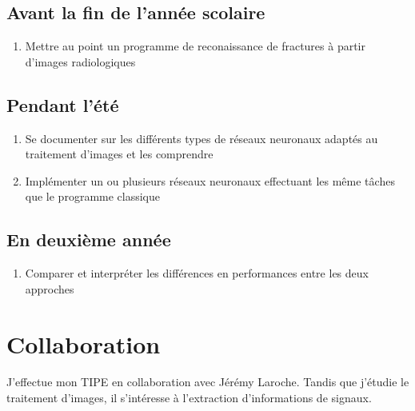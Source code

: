 \documentclass{article}
\begin{document}
\subsection{Avant la fin de l'année scolaire}

\begin{enumerate}
	\item Mettre au point un programme de reconaissance de fractures à partir d'images radiologiques
\end{enumerate}

\subsection{Pendant l'été}

\begin{enumerate}
	\item Se documenter sur les différents types de réseaux neuronaux adaptés au traitement d'images et les comprendre
	\item Implémenter un ou plusieurs réseaux neuronaux effectuant les même tâches que le programme classique
\end{enumerate}

\subsection{En deuxième année}
\begin{enumerate}
	\item Comparer et interpréter les différences en performances entre les deux approches
\end{enumerate}
\section{Collaboration}

J'effectue mon TIPE en collaboration avec Jérémy Laroche. 
Tandis que j'étudie le traitement d'images, il s'intéresse à l'extraction d'informations de signaux.
\end{document}

